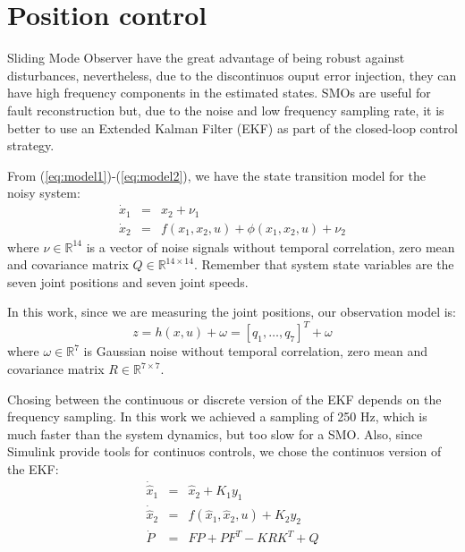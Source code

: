 \documentclass[conference,letterpaper]{ieeeconf}
\begin{document}
\section{Position control}
\label{sec:Control}
Sliding Mode Observer have the great advantage of being robust against disturbances, nevertheless, due to the discontinuos ouput error injection, they can have high frequency components in the estimated states. SMOs are useful for fault reconstruction but, due to the noise and low frequency sampling rate, it is better to use an Extended Kalman Filter (EKF) as part of the closed-loop control strategy.

From (\ref{eq:model1})-(\ref{eq:model2}), we have the state transition model for the noisy system:
\begin{eqnarray}
    \dot{x}_1 &=& x_2 + \nu_1\label{eq:noisymodel1}\\
    \dot{x}_2 &=& f(x_1, x_2, u) + \phi(x_1, x_2, u) + \nu_2\label{eq:noisymodel2}
\end{eqnarray}
where $\nu \in\mathbb{R}^14$ is a vector of noise signals without temporal correlation, zero mean and covariance matrix $Q\in\mathbb{R}^{14\times 14}$. Remember that system state variables are the seven joint positions and seven joint speeds.

In this work, since we are measuring the joint positions, our observation model is:
\begin{equation}
  z = h(x,u) + \omega = [q_1,\dots,q_7]^T + \omega
  \label{eq:obsmodel}
\end{equation}
where $\omega\in\mathbb{R}^7$ is Gaussian noise without temporal correlation, zero mean and covariance matrix $R\in\mathbb{R}^{7\times 7}$.

Chosing between the continuous or discrete version of the EKF depends on the frequency sampling. In this work we achieved a sampling of 250 Hz, which is much faster than the system dynamics, but too slow for a SMO. Also, since Simulink provide tools for continuos controls, we chose the continuos version of the EKF:
\begin{eqnarray}
  \dot{\hat{x}}_1 &=& \hat{x}_2 + K_1 y_1 \label{eq:ekf1}\\
  \dot{\hat{x}}_2 &=& f(\hat{x}_1, \hat{x}_2, u) + K_2 y_2\label{eq:ekf2}\\
  \dot{P} &=& FP + PF^T - KRK^T + Q\label{eq:ekf3}
\end{eqnarray}
\end{document}
